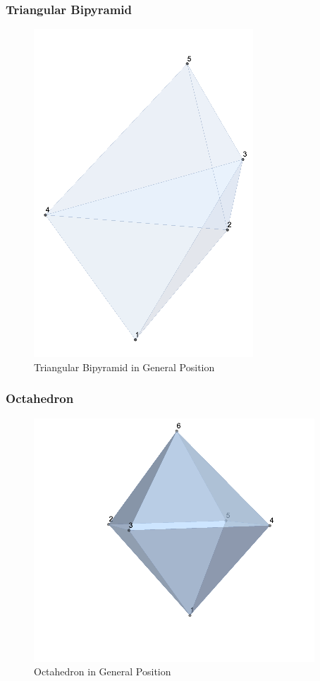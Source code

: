 \documentclass{beamer}
\begin{document}
\begin{frame}
\frametitle{Triangular Bipyramid}
    \begin{figure}[h] %
        \includegraphics[scale = 0.4]{TriBiPy.png} %
        \caption{Triangular Bipyramid in General Position}
    \end{figure}
\end{frame}


\begin{frame}
\frametitle{Octahedron}
    \begin{figure}[h] %
        \includegraphics[scale = 0.4]{Octo.png} %
        \caption{Octahedron in General Position}
    \end{figure}
\end{frame}
\end{document}

